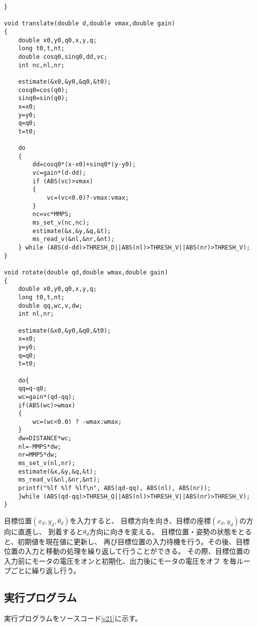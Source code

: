 \begin{lstlisting}[caption=演習20のプログラム,label=s20]
}

void translate(double d,double vmax,double gain)
{
    double x0,y0,q0,x,y,q;
    long t0,t,nt;
    double cosq0,sinq0,dd,vc;
    int nc,nl,nr;

    estimate(&x0,&y0,&q0,&t0);
    cosq0=cos(q0);
    sinq0=sin(q0);
    x=x0;
    y=y0;
    q=q0;
    t=t0;

    do
    {
        dd=cosq0*(x-x0)+sinq0*(y-y0);
        vc=gain*(d-dd);
        if (ABS(vc)>vmax)
        {
            vc=(vc<0.0)?-vmax:vmax;
        }
        nc=vc*MMPS;
        ms_set_v(nc,nc);
        estimate(&x,&y,&q,&t);
        ms_read_v(&nl,&nr,&nt);
    } while (ABS(d-dd)>THRESH_D||ABS(nl)>THRESH_V||ABS(nr)>THRESH_V);
}

void rotate(double qd,double wmax,double gain)
{
    double x0,y0,q0,x,y,q;
    long t0,t,nt;
    double qq,wc,v,dw;
    int nl,nr;

    estimate(&x0,&y0,&q0,&t0);
    x=x0;
    y=y0;
    q=q0;
    t=t0;

    do{
    qq=q-q0;
    wc=gain*(qd-qq);
    if(ABS(wc)>wmax)
    {
        wc=(wc<0.0) ? -wmax:wmax;
    }
    dw=DISTANCE*wc;
    nl=-MMPS*dw;
    nr=MMPS*dw;
    ms_set_v(nl,nr);
    estimate(&x,&y,&q,&t);
    ms_read_v(&nl,&nr,&nt);
    printf("%lf %lf %lf\n", ABS(qd-qq), ABS(nl), ABS(nr));
    }while (ABS(qd-qq)>THRESH_Q||ABS(nl)>THRESH_V||ABS(nr)>THRESH_V);
}
\end{lstlisting}

目標位置$(x_d, y_d, \theta_d)$を入力すると、
目標方向を向き、目標の座標$(x_d, y_d)$の方向に直進し、
到着すると$\theta_d$方向に向きを変える。
目標位置・姿勢の状態をとると、初期値を現在値に更新し、
再び目標位置の入力待機を行う。その後、目標位置の入力と移動の処理を繰り返して行うことができる。
その際、目標位置の入力前にモータの電圧をオンと初期化、出力後にモータの電圧をオフ
を毎ループごとに繰り返し行う。

\subsection{実行プログラム}
実行プログラムをソースコード\ref{s21}に示す。

